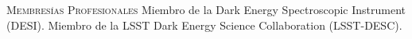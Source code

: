 \begin{rubric}{\faGlobe \textsc{Membresías Profesionales}}
\entry*[]
	Miembro de la Dark Energy Spectroscopic Instrument (DESI).
\entry*[]
	Miembro de la LSST Dark Energy Science Collaboration (LSST-DESC).
\end{rubric}
